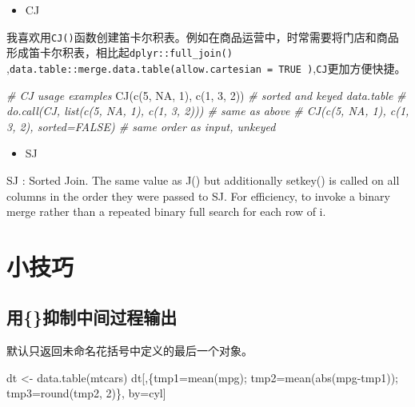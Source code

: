 \documentclass[
]{book}
\newenvironment{Shaded}{\begin{snugshade}}{\end{snugshade}}
\newcommand{\CommentTok}[1]{\textcolor[rgb]{0.56,0.35,0.01}{\textit{#1}}}
\newcommand{\ConstantTok}[1]{\textcolor[rgb]{0.00,0.00,0.00}{#1}}
\newcommand{\DecValTok}[1]{\textcolor[rgb]{0.00,0.00,0.81}{#1}}
\newcommand{\FunctionTok}[1]{\textcolor[rgb]{0.00,0.00,0.00}{#1}}
\newcommand{\NormalTok}[1]{#1}
\newcommand{\OtherTok}[1]{\textcolor[rgb]{0.56,0.35,0.01}{#1}}
\newcommand{\SpecialCharTok}[1]{\textcolor[rgb]{0.00,0.00,0.00}{#1}}
\providecommand{\tightlist}{%
  \setlength{\itemsep}{0pt}\setlength{\parskip}{0pt}}
\begin{document}
\begin{itemize}
\tightlist
\item
  CJ
\end{itemize}

我喜欢用\texttt{CJ()}函数创建笛卡尔积表。例如在商品运营中，时常需要将门店和商品形成笛卡尔积表，相比起\texttt{dplyr::full\_join()} ,\texttt{data.table::merge.data.table(allow.cartesian\ =\ TRUE\ )},\texttt{CJ}更加方便快捷。

\begin{Shaded}
\begin{Highlighting}[]
\CommentTok{\# CJ usage examples}
\FunctionTok{CJ}\NormalTok{(}\FunctionTok{c}\NormalTok{(}\DecValTok{5}\NormalTok{, }\ConstantTok{NA}\NormalTok{, }\DecValTok{1}\NormalTok{), }\FunctionTok{c}\NormalTok{(}\DecValTok{1}\NormalTok{, }\DecValTok{3}\NormalTok{, }\DecValTok{2}\NormalTok{))                 }\CommentTok{\# sorted and keyed data.table}
\CommentTok{\# do.call(CJ, list(c(5, NA, 1), c(1, 3, 2)))  \# same as above}
\CommentTok{\# CJ(c(5, NA, 1), c(1, 3, 2), sorted=FALSE)   \# same order as input, unkeyed}
\end{Highlighting}
\end{Shaded}

\begin{itemize}
\tightlist
\item
  SJ
\end{itemize}

SJ : Sorted Join. The same value as J() but additionally setkey() is called on all columns in the order they were passed to SJ. For efficiency, to invoke a binary merge rather than a repeated binary full search for each row of i.

\hypertarget{ux5c0fux6280ux5de7}{%
\section{小技巧}\label{ux5c0fux6280ux5de7}}

\hypertarget{ux7528ux6291ux5236ux4e2dux95f4ux8fc7ux7a0bux8f93ux51fa}{%
\subsection{用\{\}抑制中间过程输出}\label{ux7528ux6291ux5236ux4e2dux95f4ux8fc7ux7a0bux8f93ux51fa}}

默认只返回未命名花括号中定义的最后一个对象。

\begin{Shaded}
\begin{Highlighting}[]
\NormalTok{dt }\OtherTok{\textless{}{-}} \FunctionTok{data.table}\NormalTok{(mtcars)}
\NormalTok{dt[,\{tmp1}\OtherTok{=}\FunctionTok{mean}\NormalTok{(mpg); tmp2}\OtherTok{=}\FunctionTok{mean}\NormalTok{(}\FunctionTok{abs}\NormalTok{(mpg}\SpecialCharTok{{-}}\NormalTok{tmp1)); tmp3}\OtherTok{=}\FunctionTok{round}\NormalTok{(tmp2, }\DecValTok{2}\NormalTok{)\}, by}\OtherTok{=}\NormalTok{cyl]}
\end{Highlighting}
\end{Shaded}
\end{document}
